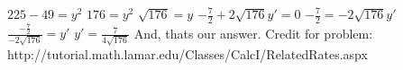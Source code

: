 \documentclass{article}
\begin{document}
\newline
\newline
$225-49 = y^2$
\newline
\newline
$176 = y^2$
\newline
\newline
$\sqrt{176} = y$
\newline
\newline
$-\frac{7}{2}+2\sqrt{176}y'=0$
\newline
\newline
$-\frac{7}{2}=-2\sqrt{176}y'$
\newline
\newline
$\frac{-\frac{7}{2}}{-2\sqrt{176}} = y'$
\newline
\newline
$y' = \frac{7}{4\sqrt{176}}$
\newline
\newline
And, thats our answer.
\newline
\newline
Credit for problem: http://tutorial.math.lamar.edu/Classes/CalcI/RelatedRates.aspx
\end{document}
